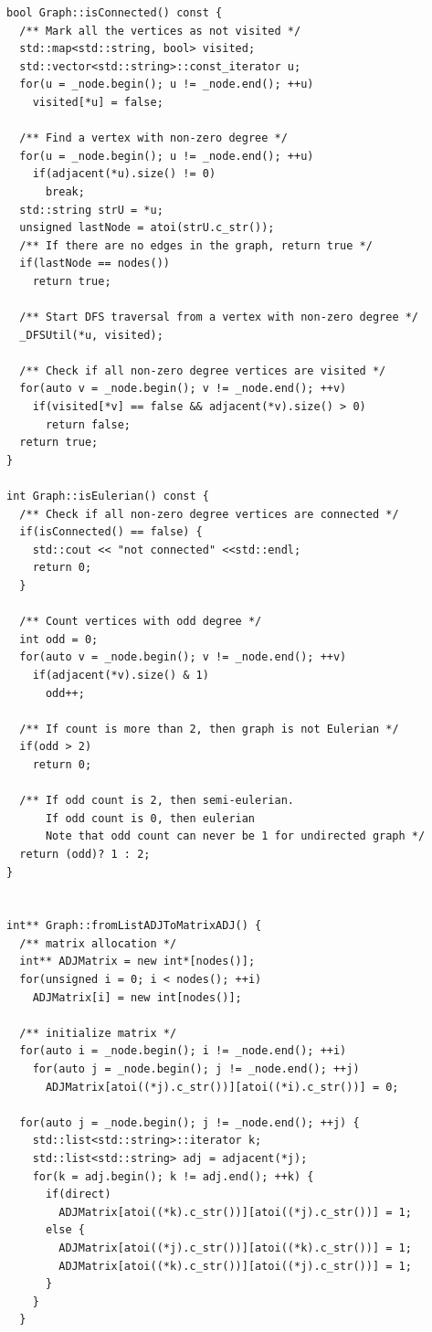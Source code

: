 \documentclass[10pt,a4paper]{article}
\begin{document}
\begin{lstlisting}
bool Graph::isConnected() const {
  /** Mark all the vertices as not visited */
  std::map<std::string, bool> visited;
  std::vector<std::string>::const_iterator u;
  for(u = _node.begin(); u != _node.end(); ++u) 
    visited[*u] = false;
 
  /** Find a vertex with non-zero degree */
  for(u = _node.begin(); u != _node.end(); ++u)
    if(adjacent(*u).size() != 0)
      break;
  std::string strU = *u;
  unsigned lastNode = atoi(strU.c_str());
  /** If there are no edges in the graph, return true */
  if(lastNode == nodes())
    return true;
 
  /** Start DFS traversal from a vertex with non-zero degree */
  _DFSUtil(*u, visited);
 
  /** Check if all non-zero degree vertices are visited */
  for(auto v = _node.begin(); v != _node.end(); ++v)
    if(visited[*v] == false && adjacent(*v).size() > 0) 
      return false;
  return true;
}

int Graph::isEulerian() const {
  /** Check if all non-zero degree vertices are connected */
  if(isConnected() == false) {
    std::cout << "not connected" <<std::endl;
    return 0;
  }
 
  /** Count vertices with odd degree */
  int odd = 0;
  for(auto v = _node.begin(); v != _node.end(); ++v)
    if(adjacent(*v).size() & 1)
      odd++;
 
  /** If count is more than 2, then graph is not Eulerian */
  if(odd > 2)
    return 0;
 
  /** If odd count is 2, then semi-eulerian.
      If odd count is 0, then eulerian
      Note that odd count can never be 1 for undirected graph */
  return (odd)? 1 : 2;
}


int** Graph::fromListADJToMatrixADJ() {
  /** matrix allocation */
  int** ADJMatrix = new int*[nodes()];
  for(unsigned i = 0; i < nodes(); ++i)
    ADJMatrix[i] = new int[nodes()];

  /** initialize matrix */
  for(auto i = _node.begin(); i != _node.end(); ++i)
    for(auto j = _node.begin(); j != _node.end(); ++j) 
      ADJMatrix[atoi((*j).c_str())][atoi((*i).c_str())] = 0;

  for(auto j = _node.begin(); j != _node.end(); ++j) {
    std::list<std::string>::iterator k;
    std::list<std::string> adj = adjacent(*j);
    for(k = adj.begin(); k != adj.end(); ++k) {
      if(direct)  
        ADJMatrix[atoi((*k).c_str())][atoi((*j).c_str())] = 1;
      else {
        ADJMatrix[atoi((*j).c_str())][atoi((*k).c_str())] = 1;
        ADJMatrix[atoi((*k).c_str())][atoi((*j).c_str())] = 1;
      }
    }
  }


\end{lstlisting}
\end{document}
